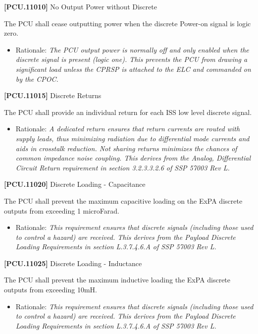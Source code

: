 \documentclass[12pt,oneside,oldfontcommands]{memoir}
\begin{document}
\textbf{[PCU.11010]} No Output Power without Discrete

The \gls{PCU} shall cease outputting power when the discrete Power-on signal is logic zero.

\begin{itemize}
\item{} Rationale: \emph{The PCU output power is normally off and only enabled when the discrete signal is present (logic one). This prevents the PCU from drawing a significant load unless the CPRSP is attached to the ELC and commanded on by the CPOC.}

\end{itemize}

\textbf{[PCU.11015]} Discrete Returns

The \gls{PCU} shall provide an individual return for each \gls{ISS} low level discrete signal.

\begin{itemize}
\item{} Rationale: \emph{A dedicated return ensures that return currents are routed with supply leads, thus minimizing radiation due to differential mode currents and aids in crosstalk reduction. Not sharing returns minimizes the chances of common impedance noise coupling. This derives from the Analog, Differential Circuit Return requirement in section 3.2.3.3.2.6 of SSP 57003 Rev L.}

\end{itemize}

\textbf{[PCU.11020]} Discrete Loading - Capacitance

The \gls{PCU} shall prevent the maximum capacitive loading on the \gls{ExPA} discrete outputs from exceeding 1 microFarad.

\begin{itemize}
\item{} Rationale: \emph{This requirement ensures that discrete signals (including those used to control a hazard) are received. This derives from the Payload Discrete Loading Requirements in section L.3.7.4.6.A of SSP 57003 Rev L.}

\end{itemize}

\textbf{[PCU.11025]} Discrete Loading - Inductance

The \gls{PCU} shall prevent the maximum inductive loading the \gls{ExPA} discrete outputs from exceeding 10mH.

\begin{itemize}
\item{} Rationale: \emph{This requirement ensures that discrete signals (including those used to control a hazard) are received. This derives from the Payload Discrete Loading Requirements in section L.3.7.4.6.A of SSP 57003 Rev L.}

\end{itemize}
\end{document}

